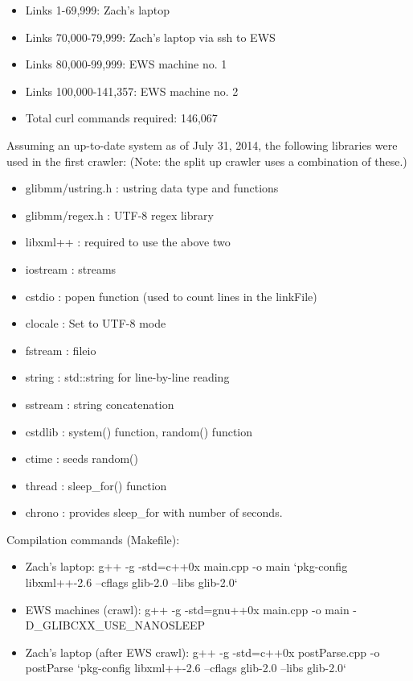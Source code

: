 \documentclass{acm} %
\begin{document}
\begin{CJK}{UTF8}{zhsong}
\begin{itemize}
 \item Links 1-69,999: Zach's laptop
 \item Links 70,000-79,999: Zach's laptop via ssh to EWS
 \item Links 80,000-99,999: EWS machine no. 1
 \item Links 100,000-141,357: EWS machine no. 2
 \item Total curl commands required: 146,067
\end{itemize}

Assuming an up-to-date system as of July 31, 2014, the following libraries were used in the first crawler: (Note: the split up crawler uses a combination of these.)

\begin{itemize}
 \item glibmm/ustring.h : ustring data type and functions
 \item glibmm/regex.h : UTF-8 regex library
 \item libxml++ : required to use the above two
 \item iostream : streams
 \item cstdio : popen function (used to count lines in the linkFile)
 \item clocale : Set to UTF-8 mode
 \item fstream : fileio
 \item string : std::string for line-by-line reading
 \item sstream : string concatenation
 \item cstdlib : system() function, random() function
 \item ctime : seeds random()
 \item thread : sleep\_for() function
 \item chrono : provides sleep\_for with number of seconds.
\end{itemize}

Compilation commands (Makefile):

\begin{itemize}
 \item Zach's laptop: g++ -g -std=c++0x main.cpp -o main `pkg-config libxml++-2.6 --cflags glib-2.0 --libs glib-2.0`
 \item EWS machines (crawl): g++ -g -std=gnu++0x main.cpp -o main -D\_GLIBCXX\_USE\_NANOSLEEP
 \item Zach's laptop (after EWS crawl): g++ -g -std=c++0x postParse.cpp -o postParse `pkg-config libxml++-2.6 --cflags glib-2.0 --libs glib-2.0`
\end{itemize}


\end{CJK}
\end{document}
